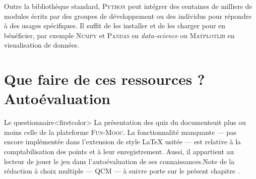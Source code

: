 Outre la bibliothèque standard, \textsc{Python} peut intégrer des centaines de milliers de modules écrits par des groupes de développement ou des individus pour répondre à des usages spécifiques. Il suffit de les installer et de les charger pour en bénéficier, par exemple \textsc{Numpy} et \textsc{Pandas} en \textit{data-science} ou \textsc{Matplotlib} en visualisation de données.




\section[Que faire de ces ressources ? Quiz]{Que faire de ces ressources ? Autoévaluation}
\label{sec:XI.5}

Le questionnaire\caution[t]<firstcolor>{%
La présentation des quiz du document\linebreak suit plus ou moins celle de la platefor\-me \textsc{Fun-Mooc}. La fonctionnalité manquante --- pas encore implémentée dans l'extension de style \LaTeX{} usitée --- est relative à la comptabilisation des points et à leur enregistrement. Aussi, il appartient au lecteur de jouer le jeu dans l'auto\-évaluation de ses connaissances.}{Note de la rédaction}
à choix multiple%
--- QCM --- à suivre porte sur le présent chapitre .
\parnotes

\vspace{6pt}

